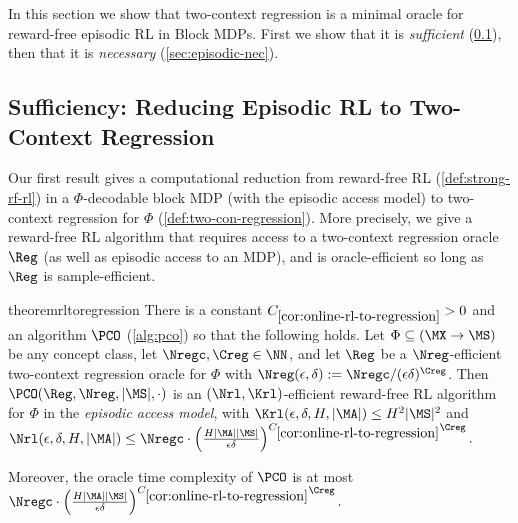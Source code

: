 \nc{\Nregc}{\Nreg^\circ}

\nc{\Nrlc}{\Nrl^\circ}
\nc{\Krlc}{\Krl^\circ}

In this section we show that two-context regression is a minimal oracle for reward-free episodic RL in Block MDPs. First we show that it is \emph{sufficient} (\cref{sec:episodic-suff}), then that it is \emph{necessary} (\cref{sec:episodic-nec}).

\subsection{Sufficiency: Reducing Episodic RL to Two-Context Regression}\label{sec:episodic-suff}

Our first result gives a computational reduction from reward-free RL (\cref{def:strong-rf-rl}) in a $\Phi$-decodable block MDP (with the episodic access model) to two-context regression for $\Phi$ (\cref{def:two-con-regression}). More precisely, we give a reward-free RL algorithm that requires access to a two-context regression oracle $\Reg$ (as well as episodic access to an MDP), and is oracle-efficient so long as $\Reg$ is sample-efficient. %

\begin{restatable}{theorem}{rltoregression}\label{cor:online-rl-to-regression}
There is a constant $C_{\ref{cor:online-rl-to-regression}}>0$ and an algorithm $\PCO$ (\cref{alg:pco}) so that the following holds. Let $\Phi \subseteq (\MX\to\MS)$ be any concept class, let $\Nregc,\Creg \in \NN$, and let $\Reg$ be a $\Nreg$-efficient two-context regression oracle for $\Phi$ with $\Nreg(\epsilon,\delta) := \Nregc/(\epsilon\delta)^{\Creg}$. Then $\PCO(\Reg,\Nreg,|\MS|,\cdot)$ %
is an $(\Nrl,\Krl)$-efficient reward-free RL algorithm for $\Phi$ in the \emph{episodic access model}, with $\Krl(\epsilon,\delta,H,|\MA|) \leq H^2|\MS|^2$ and $\Nrl(\epsilon,\delta,H,|\MA|) \leq \Nregc \cdot \left(\frac{H|\MA||\MS|}{\epsilon\delta}\right)^{C_{\ref{cor:online-rl-to-regression}}\Creg}.$
\iffalse
\begin{itemize}
    \item $\Krl(\epsilon,\delta,H,|\MA|) \leq H^2|\MS|^2$
    \item $\Nrl(\epsilon,\delta,H,|\MA|) \leq \left(\frac{H|\MA||\MS|}{\epsilon\delta}\right)^{C_{\ref{cor:online-rl-to-regression}}} \Nreg\left(\left(\frac{\epsilon\delta}{H|\MA||\MS|}\right)^{C_{\ref{cor:online-rl-to-regression}}},\left(\frac{\epsilon\delta}{H|\MA||\MS|}\right)^{C_{\ref{cor:online-rl-to-regression}}}\right)$.
\end{itemize}
\fi
Moreover, the oracle time complexity of $\PCO$ is at most $\Nregc \cdot \left(\frac{H|\MA||\MS|}{\epsilon\delta}\right)^{C_{\ref{cor:online-rl-to-regression}}\Creg}.$
\end{restatable}

